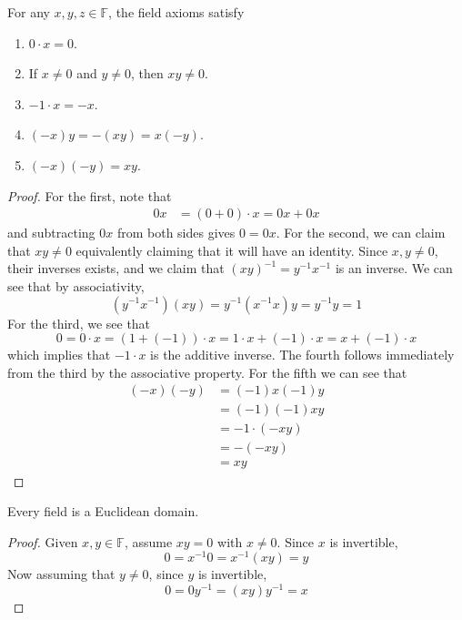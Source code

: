   \begin{lemma}
    For any $x, y, z \in \mathbb{F}$, the field axioms satisfy 
    \begin{enumerate}
      \item $0 \cdot x = 0$.
      \item If $x \neq 0$ and $y \neq 0$, then $x y \neq 0$.
      \item $-1 \cdot x = -x$. 
      \item $(-x) y = - (xy) = x (-y)$. 
      \item $(-x) (-y) = xy$. 
    \end{enumerate}
  \end{lemma} 
  \begin{proof}
    For the first, note that 
    \begin{align}
      0 x & = (0 + 0) \cdot x = 0 x + 0x 
    \end{align}
    and subtracting $0x$ from both sides gives $0 = 0x$. For the second, we can claim that $xy \neq 0$ equivalently claiming that it will have an identity. Since $x, y \neq 0$, their inverses exists, and we claim that $(xy)^{-1} = y^{-1} x^{-1}$ is an inverse. We can see that by associativity, 
    \begin{equation}
      (y^{-1} x^{-1}) (xy) = y^{-1} (x^{-1} x) y = y^{-1} y = 1
    \end{equation} 
    For the third, we see that 
    \begin{equation}
      0 = 0 \cdot x = (1 + (-1)) \cdot x = 1 \cdot x + (-1) \cdot x = x + (-1) \cdot x 
    \end{equation}
    which implies that $-1 \cdot x$ is the additive inverse. The fourth follows immediately from the third by the associative property. For the fifth we can see that 
    \begin{align}
      (-x) (-y) & = (-1) x (-1) y && \tag{property 3} \\
                & = (-1) (-1) x y && \tag{$\times$ is commutative} \\
                & = -1 \cdot (-xy) && \tag{property 3} \\
                & = -(-xy) && \tag{property 3} \\
                & = xy && \tag{addition property 4}
    \end{align}
  \end{proof}


  \begin{theorem}
    Every field is a Euclidean domain. 
  \end{theorem}
  \begin{proof}
    Given $x, y \in \mathbb{F}$, assume $x y = 0$ with $x \neq 0$. Since $x$ is invertible,
    \begin{equation}
      0 = x^{-1} 0 = x^{-1} (x y) = y
    \end{equation}
    Now assuming that $y \neq 0$, since $y$ is invertible, 
    \begin{equation}
      0 = 0 y^{-1} = (x y) y^{-1} = x
    \end{equation}
  \end{proof}

